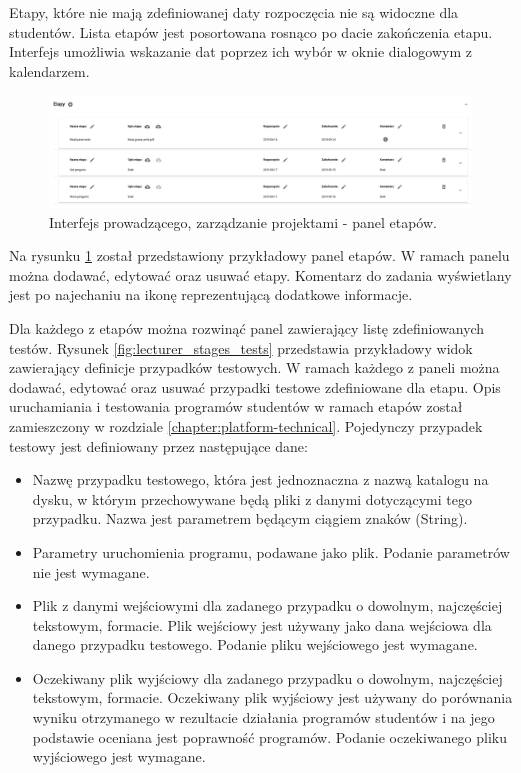 Etapy, które nie mają zdefiniowanej daty rozpoczęcia nie są widoczne dla studentów.
Lista etapów jest posortowana rosnąco po dacie zakończenia etapu.
Interfejs umożliwia wskazanie dat poprzez ich wybór w oknie dialogowym z kalendarzem.

\begin{figure}[h]
    \centering
    \includegraphics[width = 15cm]{chapter04/lecturer_stages.png}
    \caption{Interfejs prowadzącego, zarządzanie projektami - panel etapów.}
    \label{fig:lecturer_stages}
\end{figure}


Na rysunku \ref{fig:lecturer_stages} został przedstawiony przykładowy panel etapów.
W ramach panelu można dodawać, edytować oraz usuwać etapy.
Komentarz do zadania wyświetlany jest po najechaniu na ikonę reprezentującą dodatkowe informacje.


Dla każdego z etapów można rozwinąć panel zawierający listę zdefiniowanych testów.
Rysunek \ref{fig:lecturer_stages_tests} przedstawia przykładowy widok zawierający definicje przypadków testowych.
W ramach każdego z paneli można dodawać, edytować oraz usuwać przypadki testowe zdefiniowane dla etapu.
Opis uruchamiania i testowania programów studentów w ramach etapów został zamieszczony w rozdziale \ref{chapter:platform-technical}.
Pojedynczy przypadek testowy jest definiowany przez następujące dane:
\begin {itemize}
    \item Nazwę przypadku testowego, która jest jednoznaczna z nazwą katalogu na dysku, w którym przechowywane będą pliki z danymi dotyczącymi tego przypadku.
    Nazwa jest parametrem będącym ciągiem znaków (String).
    \item Parametry uruchomienia programu, podawane jako plik.
    Podanie parametrów nie jest wymagane.
    \item Plik z danymi wejściowymi dla zadanego przypadku o dowolnym, najczęściej tekstowym, formacie.
    Plik wejściowy jest używany jako dana wejściowa dla danego przypadku testowego.
    Podanie pliku wejściowego jest wymagane.
    \item Oczekiwany plik wyjściowy dla zadanego przypadku o dowolnym, najczęściej tekstowym, formacie.
    Oczekiwany plik wyjściowy jest używany do porównania wyniku otrzymanego w rezultacie działania programów studentów i na jego podstawie oceniana jest poprawność programów.
    Podanie oczekiwanego pliku wyjściowego jest wymagane.
\end {itemize}

